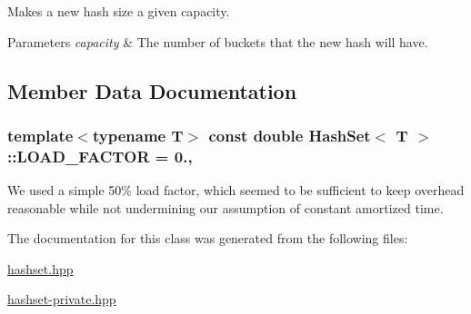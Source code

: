 Makes a new hash size a given capacity. 


\begin{DoxyParams}{Parameters}
{\em capacity} & The number of buckets that the new hash will have. \\
\hline
\end{DoxyParams}


\subsection{Member Data Documentation}
\hypertarget{class_hash_set_a0d5b0c2205b8b785733e0f71048af858}{
\subsubsection[{L\-O\-A\-D\-\_\-\-F\-A\-C\-T\-O\-R}]{\setlength{\rightskip}{0pt plus 5cm}template$<$typename T$>$ const double {\bf Hash\-Set}$<$ T $>$\-::L\-O\-A\-D\-\_\-\-F\-A\-C\-T\-O\-R = 0.\hspace{0.3cm}{\ttfamily [static]}, {\ttfamily [private]}}}\label{class_hash_set_a0d5b0c2205b8b785733e0f71048af858}
We used a simple 50\% load factor, which seemed to be sufficient to keep overhead reasonable while not undermining our assumption of constant amortized time. 

The documentation for this class was generated from the following files\-:\begin{DoxyCompactItemize}
\item 
\hyperlink{hashset_8hpp}{hashset.\-hpp}\item 
\hyperlink{hashset-private_8hpp}{hashset-\/private.\-hpp}\end{DoxyCompactItemize}

